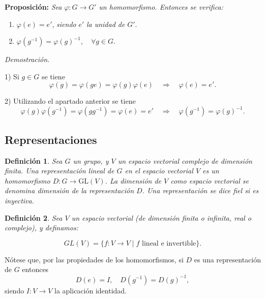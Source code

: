 \documentclass{report}
\newtheorem{definition}{Definición}
\begin{document}
\vspace{.4cm}

\textbf{Proposición:} \textit{Sea} \( \varphi: G \to G' \) \textit{un homomorfismo. Entonces se verifica:}

\begin{enumerate}
    \item \( \varphi(e) = e' \), \textit{siendo} \( e' \) \textit{la unidad de} \( G' \).
    \item \( \varphi(g^{-1}) = \varphi(g)^{-1}, \quad \forall g \in G \).
\end{enumerate}



\textit{Demostración.}

1) Si \( g \in G \) se tiene
\[
\varphi(g) = \varphi(g e) = \varphi(g) \varphi(e) \quad \Longrightarrow \quad \varphi(e) = e'.
\]

2) Utilizando el apartado anterior se tiene
\[
\varphi(g) \varphi(g^{-1}) = \varphi(gg^{-1}) = \varphi(e) = e' 
\quad \Longrightarrow \quad \varphi(g^{-1}) = \varphi(g)^{-1}.
\]




\vspace{.4cm}





\subsection{Representaciones}
\begin{definition}
 Sea \( G \) un grupo, y \( V \) un espacio vectorial complejo de dimensión finita. Una representación lineal de \( G \) en el espacio vectorial \( V \) es un homomorfismo \( D: G \to \text{GL}(V) \). La dimensión de \( V \) como espacio vectorial se denomina dimensión de la representación \( D \). Una representación se dice fiel si es inyectiva.

\end{definition}

\begin{definition}
 Sea \( V \) un espacio vectorial (de dimensión finita o infinita, real o complejo), y definamos:

\[
GL(V) = \{ f: V \to V \mid f \text{ lineal e invertible} \}.
\]
\end{definition}


Nótese que, por las propiedades de los homomorfismos, si \( D \) es una representación de \( G \) entonces
\[
D(e) = I, \quad D(g^{-1}) = D(g)^{-1},
\]
siendo \( I: V \to V \) la aplicación identidad.
\end{document}
